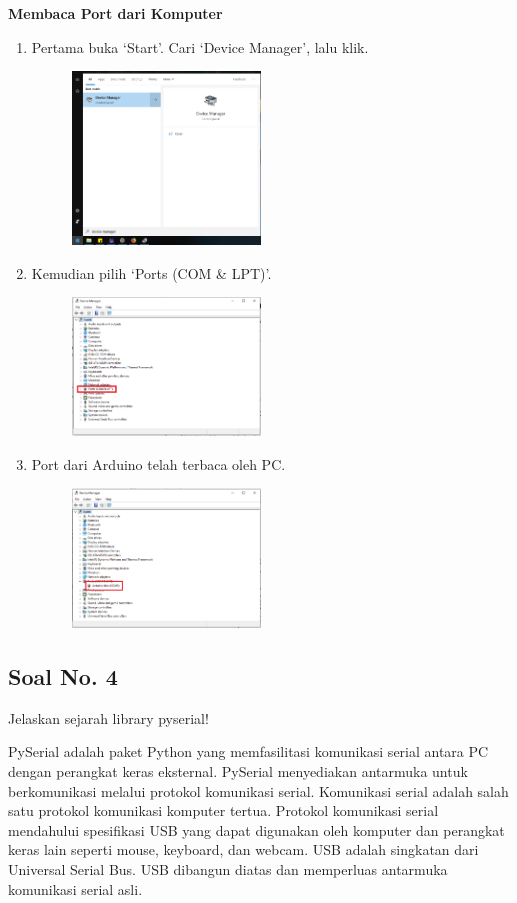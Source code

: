 \textbf{Membaca Port dari Komputer}
\begin{enumerate}
	\item Pertama buka `Start'. Cari `Device Manager', lalu klik.
	\begin{figure}[H]
		\includegraphics[width=5cm]{figures/5/1144124/Teori/d1.png}
		\centering
	\end{figure}
	\item Kemudian pilih `Ports (COM \& LPT)'.
	\begin{figure}[H]
		\includegraphics[width=5cm]{figures/5/1144124/Teori/d3.png}
		\centering
	\end{figure}
	\item Port dari Arduino telah terbaca oleh PC.
	\begin{figure}[H]
		\includegraphics[width=5cm]{figures/5/1144124/Teori/d2.png}
		\centering
	\end{figure}
\end{enumerate}

\subsection{Soal No. 4}
Jelaskan sejarah library pyserial!

PySerial adalah paket Python yang memfasilitasi komunikasi serial antara PC dengan perangkat keras eksternal. PySerial menyediakan antarmuka untuk berkomunikasi melalui protokol komunikasi serial. Komunikasi serial adalah salah satu protokol komunikasi komputer tertua. Protokol komunikasi serial mendahului spesifikasi USB yang dapat digunakan oleh komputer dan perangkat keras lain seperti mouse, keyboard, dan webcam. USB adalah singkatan dari Universal Serial Bus. USB dibangun diatas dan memperluas antarmuka komunikasi serial asli.

